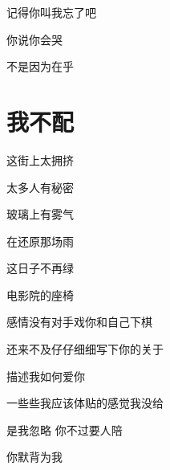 \documentclass[a4paper,10pt]{article}
\begin{document}
记得你叫我忘了吧

你说你会哭

不是因为在乎

\section{我不配}

这街上太拥挤

太多人有秘密

玻璃上有雾气



在还原那场雨

这日子不再绿

电影院的座椅

感情没有对手戏你和自己下棋

还来不及仔仔细细写下你的关于

描述我如何爱你

一些些我应该体贴的感觉我没给

是我忽略 你不过要人陪

你默背为我
\end{document}
